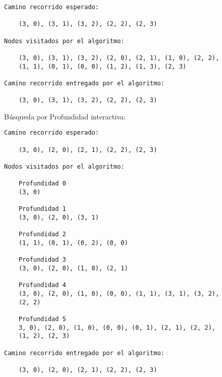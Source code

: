 \begin{lstlisting}[]
Camino recorrido esperado:

    (3, 0), (3, 1), (3, 2), (2, 2), (2, 3)
 
Nodos visitados por el algoritmo:

    (3, 0), (3, 1), (3, 2), (2, 0), (2, 1), (1, 0), (2, 2),
    (1, 1), (0, 1), (0, 0), (1, 2), (1, 3), (2, 3)

Camino recorrido entregado por el algoritmo:
    
    (3, 0), (3, 1), (3, 2), (2, 2), (2, 3)

\end{lstlisting}
\clearpage
Búsqueda por Profundidad interactiva:\\

\begin{lstlisting}[]
Camino recorrido esperado:

    (3, 0), (2, 0), (2, 1), (2, 2), (2, 3)

Nodos visitados por el algoritmo:

    Profundidad 0
    (3, 0) 
    
    Profundidad 1
    (3, 0), (2, 0), (3, 1)
    
    Profundidad 2
    (1, 1), (0, 1), (0, 2), (0, 0)
    
    Profundidad 3
    (3, 0), (2, 0), (1, 0), (2, 1)
    
    Profundidad 4
    (3, 0), (2, 0), (1, 0), (0, 0), (1, 1), (3, 1), (3, 2), 
    (2, 2)
    
    Profundidad 5
    3, 0), (2, 0), (1, 0), (0, 0), (0, 1), (2, 1), (2, 2),
    (1, 2), (2, 3)

Camino recorrido entregado por el algoritmo:
    
    (3, 0), (2, 0), (2, 1), (2, 2), (2, 3)

\end{lstlisting}

